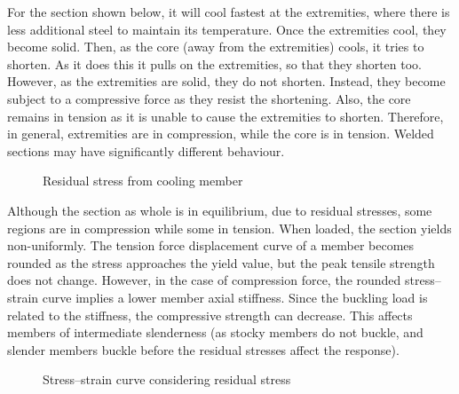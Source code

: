 \begin{itemize}
For the section shown below, it will cool fastest at the extremities, where there is less additional steel to maintain its temperature.
Once the extremities cool, they become solid.
Then, as the core (away from the extremities) cools, it tries to shorten.
As it does this it pulls on the extremities, so that they shorten too.
However, as the extremities are solid, they do not shorten.
Instead, they become subject to a compressive force as they resist the shortening.
Also, the core remains in tension as it is unable to cause the extremities to shorten.
Therefore, in general, extremities are in compression, while the core is in tension.
Welded sections may have significantly different behaviour.
\begin{figure}[H]
\centering

\caption{Residual stress from cooling member}
\end{figure}

Although the section as whole is in equilibrium, due to residual stresses, some regions are in compression while some in tension.
When loaded, the section yields non-uniformly.
The tension force displacement curve of a member becomes rounded as the stress approaches the yield value, but the peak tensile strength does not change.
However, in the case of compression force, the rounded stress--strain curve implies a lower member axial stiffness.
Since the buckling load is related to the stiffness, the compressive strength can decrease.
This affects members of intermediate slenderness (as stocky members do not buckle, and slender members buckle before the residual stresses affect the response).
\begin{figure}[H]
\centering
\caption{Stress--strain curve considering residual stress}
\end{figure}


\end{itemize}
